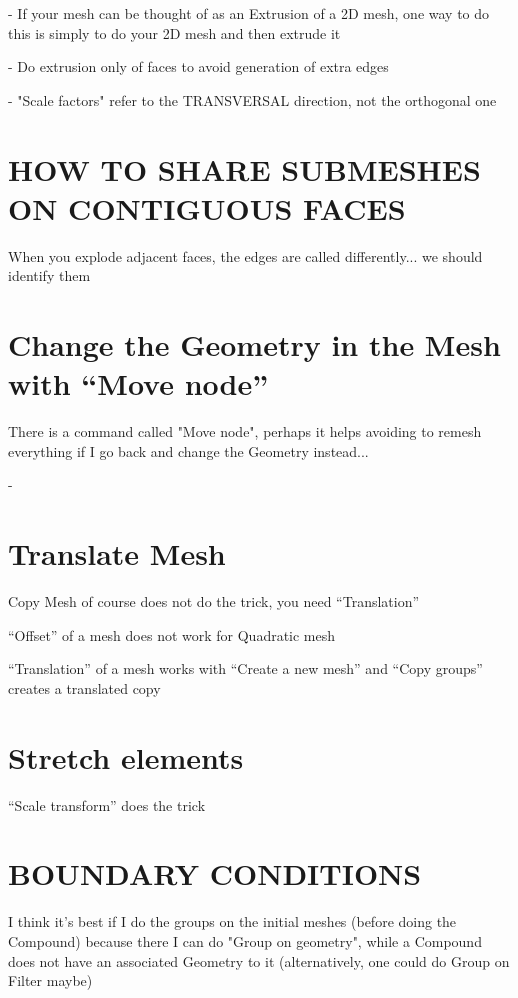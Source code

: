 \documentclass[10pt]{book}
\begin{document}
- If your mesh can be thought of as an Extrusion of a 2D mesh, one way to do this 
  is simply to do your 2D mesh and then extrude it
  
- Do extrusion only of faces to avoid generation of extra edges    

- "Scale factors" refer to the TRANSVERSAL direction, not the orthogonal one



\section{HOW TO SHARE SUBMESHES ON CONTIGUOUS FACES}


When you explode adjacent faces, the edges are called differently... we should identify them


 \section{Change the Geometry in the Mesh with ``Move node''}


 There is a command called "Move node", perhaps it helps avoiding to remesh everything if I go back and change the Geometry instead...

 - 
 

\section{Translate Mesh}

 
 Copy Mesh of course does not do the trick, you need ``Translation''
 
 ``Offset'' of a mesh does not work for Quadratic mesh
 
 ``Translation'' of a mesh works with ``Create a new mesh'' and ``Copy groups'' creates a translated copy

 
\section{Stretch elements}

  ``Scale transform'' does the trick

  
   
 \section{BOUNDARY CONDITIONS}


 I think it's best if I do the groups on the initial meshes (before doing the Compound)
  because there I can do "Group on geometry",
while a Compound does not have an associated Geometry to it
 (alternatively, one could do Group on Filter maybe)
\end{document}
